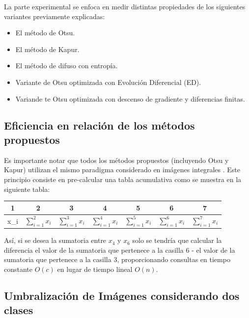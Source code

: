\documentclass[preprint,12pt]{elsarticle}
\begin{document}
La parte experimental se enfoca en medir distintas propiedades de los siguientes variantes previamente explicadas:
\begin{itemize}
    \item El método de Otsu.
    \item El método de Kapur.
    \item El método de difuso con entropía.
    \item Variante de Otsu optimizada con Evolución Diferencial (ED).
    \item Variande te Otsu optimizada con descenso de gradiente y diferencias finitas.
\end{itemize}

\subsection{Eficiencia en relación de los métodos propuestos}
Es importante notar que todos los métodos propuestos (incluyendo Otsu y Kapur) utilizan el mismo paradigma considerado en imágenes integrales \cite{viola2004robust}.
%
Este principio consiste en pre-calcular una tabla acumulativa como se muestra en la siguiente tabla:
\begin{table}[H]
\centering
\begin{tabular}{|c|c|c|c|c|c|c|}
\hline
1 & 2 & 3 & 4 & 5 & 6 & 7 \\ \hline
x\_i & $\sum_{i=1}^2 x_i$ & $\sum_{i=1}^3 x_i$ & $\sum_{i=1}^4 x_i$ & $\sum_{i=1}^5 x_i$ & $\sum_{i=1}^6 x_i$ & $\sum_{i=1}^7 x_i$ \\ \hline
\end{tabular}
\end{table}
Así, si se desea la sumatoria entre $x_4$ y $x_6$ solo se tendría que calcular la diferencia el valor de la sumatoria que pertenece a la casilla 6 - el valor de la sumatoria que pertenece a la casilla 3, proporcionando consultas en tiempo constante $O(c)$ en lugar de tiempo lineal $O(n)$.

\subsection{Umbralización de Imágenes considerando dos clases}
\end{document}

